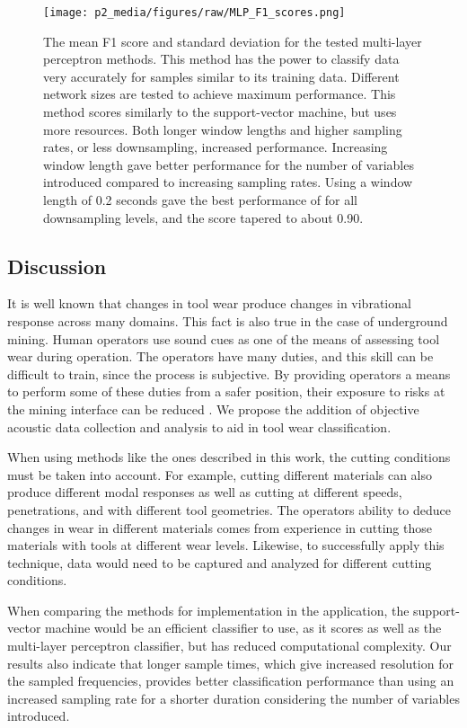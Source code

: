 \begin{figure}[t!]
\centering
\texttt{[image: p2\_media/figures/raw/MLP\_F1\_scores.png]}
\caption{
The mean F1 score and standard deviation for the tested multi-layer perceptron methods.
This method has the power to classify data very accurately for samples similar to its training data.
Different network sizes are tested to achieve maximum performance.
This method scores similarly to the support-vector machine, but uses more resources.
Both longer window lengths and higher sampling rates, or less downsampling, increased performance.
Increasing window length gave better performance for the number of variables introduced
compared to increasing sampling rates.
Using a window length of 0.2 seconds gave the best performance of for all downsampling levels,
and the score tapered to about 0.90.
}
\label{fig:perf_MLP}
\end{figure}


\subsection{Discussion}

It is well known that changes in tool wear produce changes in vibrational response
across many domains. This fact is also true in the case of underground mining. 
Human operators use sound cues as one of the means of assessing tool wear during operation.
The operators have many duties, and this skill can be difficult to train, 
since the process is subjective. By providing operators a means to perform some of these
duties from a safer position, their exposure to risks at the mining interface can be reduced
\cite{Bartels2009}. 
We propose the addition of objective acoustic data collection and analysis to aid in tool wear classification.

When using methods like the ones described in this work, the cutting conditions must be taken into account.
For example, cutting different materials can also produce different modal responses as well as cutting
at different speeds, penetrations, and with different tool geometries. The operators ability to deduce
changes in wear in different materials comes from experience in cutting those materials with tools at 
different wear levels. Likewise, to successfully apply this technique, data would need to be captured
and analyzed for different cutting conditions.

When comparing the methods for implementation in the application, the support-vector machine
would be an efficient classifier to use, as it scores as well as the multi-layer perceptron classifier,
but has reduced computational complexity. Our results also indicate that longer sample times, which 
give increased resolution for the sampled frequencies, provides better classification performance than
using an increased sampling rate for a shorter duration considering the number of variables introduced.

